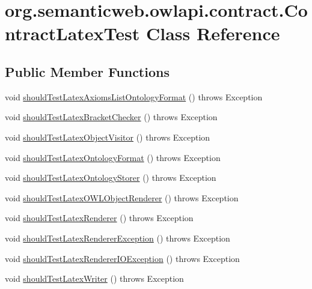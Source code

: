 \hypertarget{classorg_1_1semanticweb_1_1owlapi_1_1contract_1_1_contract_latex_test}{\section{org.\-semanticweb.\-owlapi.\-contract.\-Contract\-Latex\-Test Class Reference}
\label{classorg_1_1semanticweb_1_1owlapi_1_1contract_1_1_contract_latex_test}
}
\subsection*{Public Member Functions}
\begin{DoxyCompactItemize}
\item 
void \hyperlink{classorg_1_1semanticweb_1_1owlapi_1_1contract_1_1_contract_latex_test_a37c74efa5d46af920333f83880304d11}{should\-Test\-Latex\-Axioms\-List\-Ontology\-Format} ()  throws Exception 
\item 
void \hyperlink{classorg_1_1semanticweb_1_1owlapi_1_1contract_1_1_contract_latex_test_ab8065e0655005a10cc9833655f49a41c}{should\-Test\-Latex\-Bracket\-Checker} ()  throws Exception 
\item 
void \hyperlink{classorg_1_1semanticweb_1_1owlapi_1_1contract_1_1_contract_latex_test_a7abf7ea62dffc2af8f8026cfd2793d04}{should\-Test\-Latex\-Object\-Visitor} ()  throws Exception 
\item 
void \hyperlink{classorg_1_1semanticweb_1_1owlapi_1_1contract_1_1_contract_latex_test_a854fb0655c0c0f191124c187bbd013d0}{should\-Test\-Latex\-Ontology\-Format} ()  throws Exception 
\item 
void \hyperlink{classorg_1_1semanticweb_1_1owlapi_1_1contract_1_1_contract_latex_test_affb97dcf2d00abf62d218ec7f5abffe3}{should\-Test\-Latex\-Ontology\-Storer} ()  throws Exception 
\item 
void \hyperlink{classorg_1_1semanticweb_1_1owlapi_1_1contract_1_1_contract_latex_test_af965a326ef74b65cf6af765ae7e8449f}{should\-Test\-Latex\-O\-W\-L\-Object\-Renderer} ()  throws Exception 
\item 
void \hyperlink{classorg_1_1semanticweb_1_1owlapi_1_1contract_1_1_contract_latex_test_a6da995513bd6e7d2df2967e56b006a5e}{should\-Test\-Latex\-Renderer} ()  throws Exception 
\item 
void \hyperlink{classorg_1_1semanticweb_1_1owlapi_1_1contract_1_1_contract_latex_test_a9f7bd3f071d898eed51a7caa68ae5240}{should\-Test\-Latex\-Renderer\-Exception} ()  throws Exception 
\item 
void \hyperlink{classorg_1_1semanticweb_1_1owlapi_1_1contract_1_1_contract_latex_test_a5b0277981da9ea14b26f58a976ca3ac9}{should\-Test\-Latex\-Renderer\-I\-O\-Exception} ()  throws Exception 
\item 
void \hyperlink{classorg_1_1semanticweb_1_1owlapi_1_1contract_1_1_contract_latex_test_a11915f29cb1eb2cc1197c0f0a44cb27e}{should\-Test\-Latex\-Writer} ()  throws Exception 
\end{DoxyCompactItemize}


